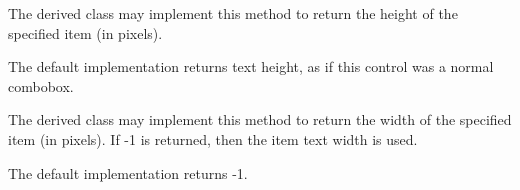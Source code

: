 \label{wxownerdrawncomboboxonmeasureitem}


The derived class may implement this method to return the height of the
specified item (in pixels).

The default implementation returns text height, as if this control was
a normal combobox.


\label{wxownerdrawncomboboxonmeasureitemwidth}


The derived class may implement this method to return the width of the
specified item (in pixels). If -1 is returned, then the item text width
is used.

The default implementation returns -1.
